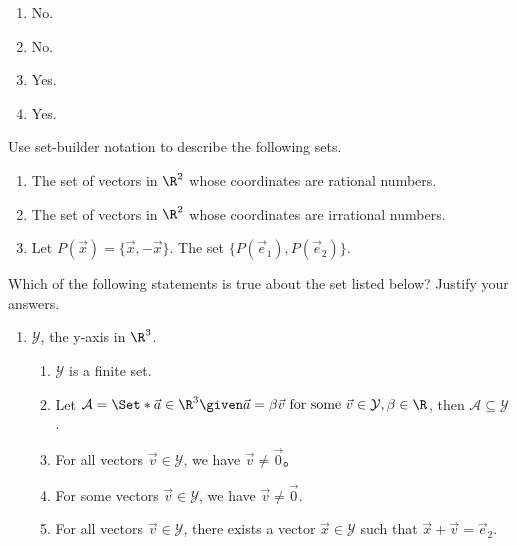 \begin{exercises}
\begin{problist}
		\begin{solution}
            \begin{enumerate}
    		    \item No.
    		    \item No.
    		    \item Yes.
    		    \item Yes.
		    \end{enumerate}
		\end{solution}
		
		\prob Use set-builder notation to describe the following sets.
		\begin{enumerate}
			\item The set of vectors in $\R^{2}$ whose coordinates are rational numbers.

			\item The set of vectors in $\R^{2}$ whose coordinates are irrational
				numbers.

			\item Let $P(\vec x) = \{\vec x, -\vec x\}$. The set $\{P(\vec e_{1}), P(
				\vec e_{2})\}$.
		\end{enumerate}

		\prob %
		Which of the following statements is true about the set listed below? Justify your
		answers.
		\begin{enumerate}
			\item $\mathcal{Y}$, the y-axis in $\R^{3}$.
				\begin{enumerate}
					\item $\mathcal{Y}$ is a finite set.

					\item Let
						$\mathcal{A} = \Set*
						{\vec a \in \R^3 \given \vec a = \beta \vec v \text{ for some } \vec v \in \mathcal{Y}, \beta \in \R}$,
						then $\mathcal{A} \subseteq \mathcal{Y}$.

					\item For all vectors $\vec v \in \mathcal{Y}$, we have $\vec v \neq
						\vec 0$。

					\item For some vectors $\vec v \in \mathcal{Y}$, we have $\vec v
						\neq \vec 0$.

					\item For all vectors $\vec v \in \mathcal{Y}$, there exists a vector
						$\vec x \in \mathcal{Y}$ such that $\vec x + \vec v = \vec e_{2}$.


\end{enumerate}
\end{enumerate}
\end{problist}
\end{exercises}

